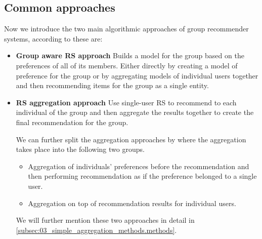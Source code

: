 \subsection{Common approaches}\label{subsec:01_group_rec_sys.common_aproaches}

Now we introduce the two main algorithmic approaches of group recommender systems, according to \cite{recommendations_to_groups-jameson2007} these are:
\begin{itemize}
    \item \textbf{Group aware RS approach}\newline
    Builds a model for the group based on the preferences of all of its members. Either directly by creating a model of preference for the group or by aggregating models of individual users together and then recommending items for the group as a single entity.
    \item \textbf{RS aggregation approach}\newline
    Use single-user RS to recommend to each individual of the group and then aggregate the results together to create the final recommendation for the group.
    
    We can further split the aggregation approaches by where the aggregation takes place into the following two groups.
    
    \begin{itemize}
        \item Aggregation of individuals' preferences before the recommendation and then performing recommendation as if the preference belonged to a single user.
        \item Aggregation on top of recommendation results for individual users.
    \end{itemize}
    
    We will further mention these two approaches in detail in \ref{subsec:03_simple_aggregation_methods.methods}.
    
    
    
\end{itemize}

